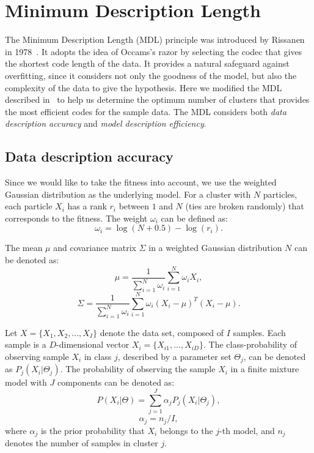 \section{Minimum Description Length} 
The Minimum Description Length (MDL) principle was introduced by Rissanen in 1978~\cite{Rissanen:1978:MDL}.
It adopts the idea of Occams's razor by selecting the codec that gives the shortest code length of the data.
It provides a natural safeguard against overfitting, 
since it considers not only the goodness of the model, 
but also the complexity of the data to give the hypothesis.
Here we modified the MDL described in~\cite{Kyrgyzov:2007:KMDL} to help us determine the optimum number of clusters that provides the most efficient codes for the sample data.
The MDL considers both \textit{data description accuracy} and \textit{model description efficiency}.


\subsection{Data description accuracy}

Since we would like to take the fitness into account, we use the weighted Gaussian distribution as the underlying model.
For a cluster with $N$ particles, each particle $X_i$ has a rank $r_i$ between $1$ and $N$ (ties are broken randomly) that corresponds to the fitness.
The weight $\omega_i$ can be defined as:
\begin{equation}
\omega_i = \log(N+0.5) - \log(r_i).
\end{equation}

The mean $\mu$ and covariance matrix $\Sigma$ in a weighted Gaussian distribution $N$ can be denoted as:
\begin{equation}
\mu = \frac{1}{\sum_{i=1}^N \omega_i} \sum_{i = 1}^{N} \omega_i X_i,
\end{equation}
\begin{equation}
\Sigma = \frac{1}{\sum_{i=1}^N \omega_i} \sum_{i = 1}^{N} \omega_i (X_i - \mu)^T (X_i - \mu).
\end{equation}


Let $X = \{X_1, X_2, ..., X_I\}$ denote the data set, composed of $I$ samples. 
Each sample is a $D$-dimensional vector $X_i = \{X_{i1}, ..., X_{iD}\}$.  
The class-probability of observing sample $X_i$ in class $j$, described by a parameter set $\Theta_j$, can be denoted as $P_j(X_i|\Theta_j)$.
The probability of observing the sample $X_i$ in a finite mixture model with $J$ components can be denoted as:
\begin{equation}
P(X_i|\Theta) = \sum_{j=1}^J \alpha_j P_j ( X_i | \Theta_j ),
\end{equation}
\begin{equation}
\alpha_j = n_j / I,
\end{equation}
where $\alpha_j$ is the prior probability that $X_i$ belongs to the $j$-th model, 
and $n_j$ denotes the number of samples in cluster $j$.  

